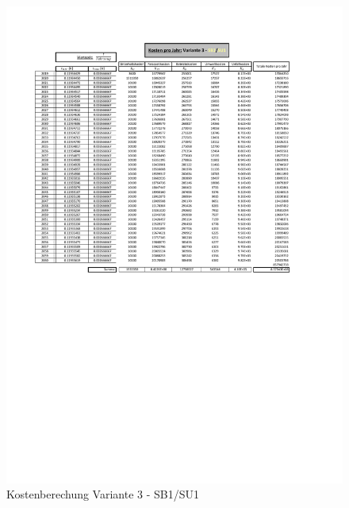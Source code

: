 \begin{figure}[h!]
	\centering
	\includegraphics[width=\textwidth]{figures/Anhang/f-00-A-V3-B1-U1}
	\caption{Kostenberechung Variante 3 - SB1/SU1}
\end{figure}

